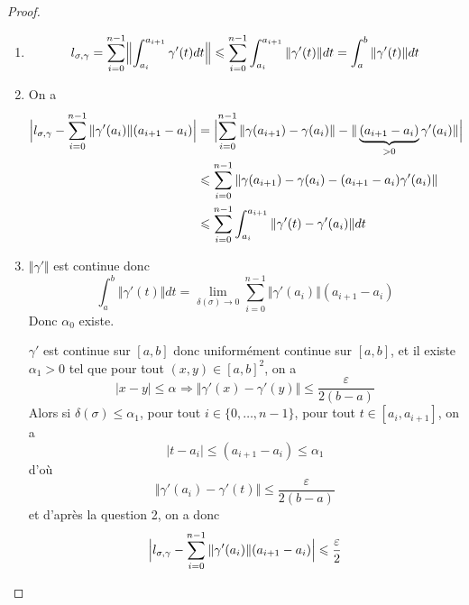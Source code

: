 \documentclass[12pt]{article}
\begin{document}
\begin{proof}
	\phantom{}
	\begin{enumerate}
		\item 
		\begin{equation}l_{\sigma,\gamma}=\sum_{i=0}^{n-1}\Bigl\Vert\int_{a_{i}}^{a_{i+1}}\gamma'(t)dt\Bigr\Vert\leqslant\sum_{i=0}^{n-1}\int_{a_{i}}^{a_{i+1}}\Vert\gamma'(t)\Vert dt=\int_{a}^{b}\Vert\gamma'(t)\Vert dt\end{equation}

		\item On a 
		\begin{align}
			\Bigl\vert l_{\sigma,\gamma}-\sum_{i=0}^{n-1}\Vert\gamma'(a_{i})\Vert(a_{i+1}-a_{i})\Bigr\vert
			&=\Bigl\vert\sum_{i=0}^{n-1}\Vert\gamma(a_{i+1})-\gamma(a_{i})\Vert-\Vert\underbrace{(a_{i+1}-a_{i})}_{>0}\gamma'(a_{i})\Vert\Bigr\vert\\
			&\leqslant\sum_{i=0}^{n-1}\Vert\gamma(a_{i+1})-\gamma(a_{i})-(a_{i+1}-a_{i})\gamma'(a_{i})\Vert\\
			&\leqslant\sum_{i=0}^{n-1}\int_{a_{i}}^{a_{i+1}}\Vert\gamma'(t)-\gamma'(a_{i})\Vert dt
		\end{align}

		\item $\Vert\gamma'\Vert$ est continue donc 
		\begin{equation}\int_{a}^{b}\Vert\gamma'(t)\Vert dt=\lim\limits_{\delta(\sigma)\to0}\sum_{i=0}^{n-1}\Vert\gamma'(a_{i})\Vert(a_{i+1}-a_{i})\end{equation}
		Donc $\alpha_{0}$ existe.

		$\gamma'$ est continue sur $[a,b]$ donc uniformément continue sur $[a,b]$, et il existe $\alpha_{1}>0$ tel que pour tout $(x,y)\in[a,b]^{2}$, on a 
		\begin{equation}\vert x-y\vert\leqslant\alpha_{}\Rightarrow\Vert\gamma'(x)-\gamma'(y)\Vert\leqslant\frac{\varepsilon}{2(b-a)}\end{equation}
		Alors si $\delta(\sigma)\leqslant\alpha_{1}$, pour tout $i\in\{0,\dots,n-1\}$, pour tout $t\in[a_{i},a_{i+1}]$, on a
		\begin{equation}\vert t-a_{i}\vert\leqslant(a_{i+1}-a_{i})\leqslant\alpha_{1}\end{equation}
		d'où 
		\begin{equation}\Vert \gamma'(a_{i})-\gamma'(t)\Vert\leqslant\frac{\varepsilon}{2(b-a)}\end{equation}
		et d'après la question 2, on a donc 
		\begin{equation}\Bigl\vert l_{\sigma,\gamma}-\sum_{i=0}^{n-1}\Vert\gamma'(a_{i})\Vert(a_{i+1}-a_{i})\Bigr\vert\leqslant\frac{\varepsilon}{2}\end{equation}


\end{enumerate}
\end{proof}
\end{document}
